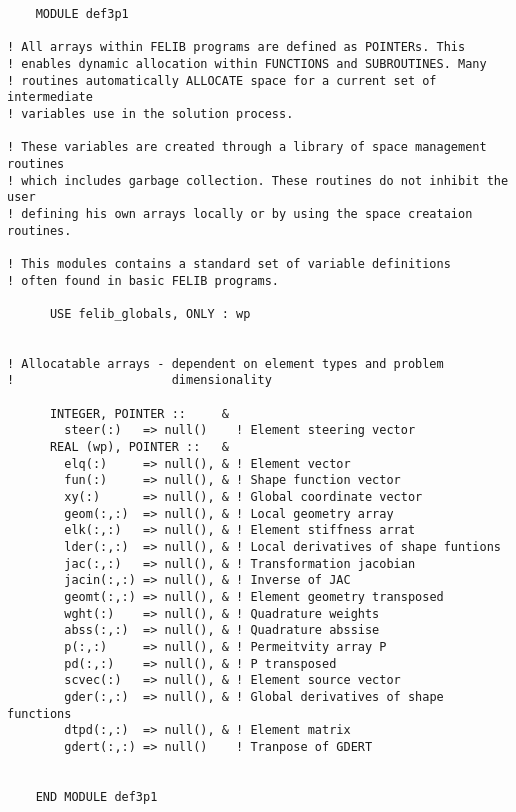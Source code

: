 \begin{verbatim}
    MODULE def3p1

! All arrays within FELIB programs are defined as POINTERs. This
! enables dynamic allocation within FUNCTIONS and SUBROUTINES. Many
! routines automatically ALLOCATE space for a current set of intermediate
! variables use in the solution process.

! These variables are created through a library of space management routines
! which includes garbage collection. These routines do not inhibit the user
! defining his own arrays locally or by using the space creataion routines.

! This modules contains a standard set of variable definitions
! often found in basic FELIB programs.

      USE felib_globals, ONLY : wp


! Allocatable arrays - dependent on element types and problem 
!                      dimensionality

      INTEGER, POINTER ::     &
        steer(:)   => null()    ! Element steering vector
      REAL (wp), POINTER ::   &
        elq(:)     => null(), & ! Element vector                              
        fun(:)     => null(), & ! Shape function vector
        xy(:)      => null(), & ! Global coordinate vector
        geom(:,:)  => null(), & ! Local geometry array
        elk(:,:)   => null(), & ! Element stiffness arrat
        lder(:,:)  => null(), & ! Local derivatives of shape funtions
        jac(:,:)   => null(), & ! Transformation jacobian
        jacin(:,:) => null(), & ! Inverse of JAC
        geomt(:,:) => null(), & ! Element geometry transposed
        wght(:)    => null(), & ! Quadrature weights
        abss(:,:)  => null(), & ! Quadrature abssise
        p(:,:)     => null(), & ! Permeitvity array P
        pd(:,:)    => null(), & ! P transposed
        scvec(:)   => null(), & ! Element source vector
        gder(:,:)  => null(), & ! Global derivatives of shape functions
        dtpd(:,:)  => null(), & ! Element matrix
        gdert(:,:) => null()    ! Tranpose of GDERT


    END MODULE def3p1
\end{verbatim}